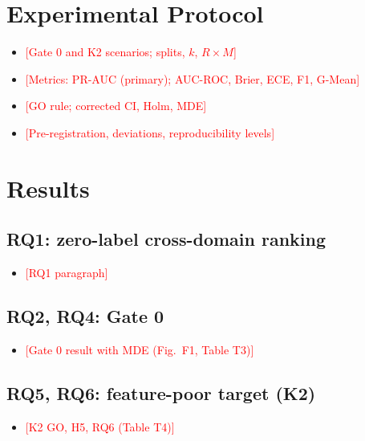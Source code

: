 \documentclass[conference]{IEEEtran}
\newcommand{\todoSV}[1]{\textcolor{red}{[#1]}}
\begin{document}
\section{Experimental Protocol}  %
\begin{itemize}
  \item \todoSV{Gate 0 and K2 scenarios; splits, $k$, $R \times M$}
  \item \todoSV{Metrics: PR-AUC (primary); AUC-ROC, Brier, ECE, F1, G-Mean}
  \item \todoSV{GO rule; corrected CI, Holm, MDE}
  \item \todoSV{Pre-registration, deviations, reproducibility levels}
\end{itemize}

\section{Results}  %
\subsection{RQ1: zero-label cross-domain ranking}
\begin{itemize}\item \todoSV{RQ1 paragraph}\end{itemize}
\subsection{RQ2, RQ4: Gate 0}
\begin{itemize}\item \todoSV{Gate 0 result with MDE (Fig.~F1, Table T3)}\end{itemize}
\subsection{RQ5, RQ6: feature-poor target (K2)}
\begin{table}[!t]\centering\scriptsize
\caption{\todoSV{K2 results caption}}

\end{table}
\begin{itemize}\item \todoSV{K2 GO, H5, RQ6 (Table T4)}\end{itemize}
\end{document}
